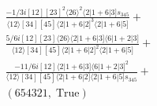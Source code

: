 \documentclass[varwidth, border=5pt]{standalone}
\begin{document}
\begin{my}
$\begin{gathered}
\scriptscriptstyle\frac{-1/3i[12][23]^2⟨26⟩^2⟨2|1+6|3]s_{345}}{⟨12⟩[34][45]⟨2|1+6|2]^3⟨2|1+6|5]}+\\
\scriptscriptstyle\frac{5/6i[12][23]⟨26⟩⟨2|1+6|3]⟨6|1+2|3]}{⟨12⟩[34][45]⟨2|1+6|2]^2⟨2|1+6|5]}+\\
\scriptscriptstyle\frac{-11/6i[12]⟨2|1+6|3]⟨6|1+2|3]^2}{⟨12⟩[34][45]⟨2|1+6|2]⟨2|1+6|5]s_{345}}+\\
\scriptscriptstyle(654321,\;\text{True})\phantom{+}
\end{gathered}$
\end{my}
\end{document}
